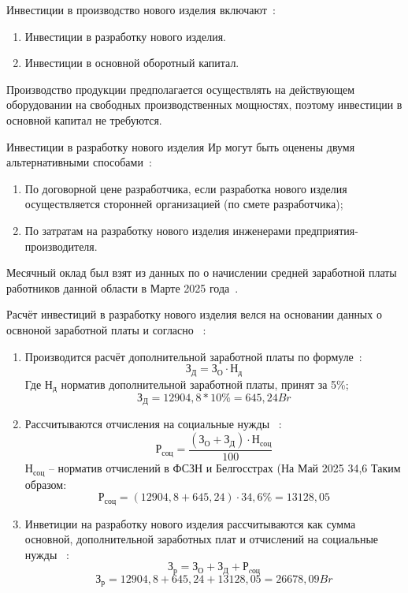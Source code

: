 Инвестиции в производство нового изделия включают~\cite{bsuir-project-economics}:
\begin{enumerate}
\item Инвестиции в разработку нового изделия.
\item Инвестиции в основной оборотный капитал.
\end{enumerate}

Производство продукции предполагается осуществлять на действующем
оборудовании на свободных производственных мощностях, поэтому
инвестиции в основной капитал не требуются.


Инвестиции в разработку нового изделия $Ир$ могут быть оценены двумя
альтернативными способами~\cite{bsuir-project-economics}:
\begin{enumerate}
\item По договорной цене разработчика, если разработка нового изделия
  осуществляется сторонней организацией (по смете разработчика);
\item По затратам на разработку нового изделия инженерами
  предприятия-производителя.
\end{enumerate}



Месячный оклад был взят из данных по о начислении средней заработной
платы работников данной области в Марте 2025
года~\cite{belstat-salary}.

% 

Расчёт инвестиций в разработку нового изделия велся на основании данных о освноной
заработной платы и согласно ~\cite{bsuir-project-economics}:
\begin{enumerate}
\item Производится расчёт дополнительной заработной платы по формуле~\cite{bsuir-project-economics}:
  \begin{equation} З_Д = З_О \cdot Н_д \end{equation}
  Где $Н_д$ норматив дополнительной заработной платы, принят за 5\%;
  $$З_Д = 12904,8 * 10\% = 645,24Br $$
\item Рассчитываются отчисления на социальные нужды ~\cite{bsuir-project-economics}:
  \begin{equation}
    Р_{соц} = \frac{(З_О + З_Д) \cdot Н_{соц}}{100}
  \end{equation}
  $Н_{соц}$ – норматив отчислений в ФСЗН и Белгосстрах (На Май 2025 34,6%
  Таким образом:
  $$Р_{соц} = (12904,8 + 645,24) \cdot 34,6\% = 13128,05$$
\item Инветиции на разработку нового изделия рассчитываются как сумма
основной, дополнительной заработных плат и отчислений на социальные
нужды ~\cite{bsuir-project-economics}:
\begin{equation}
  З_р = З_О + З_Д +Р_{cоц}
\end{equation}
 $$ З_р = 12904,8 + 645,24 + 13128,05 = 26678,09Br$$
\end{enumerate}


